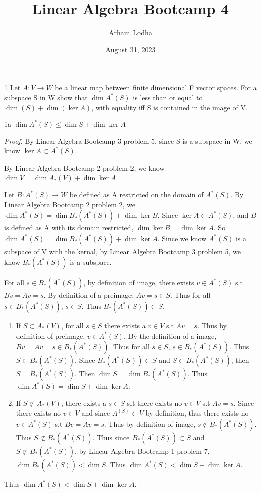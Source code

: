 \documentclass{article}
\newcommand{\rarr}[0]{\rightarrow}
\begin{document}
\title{Linear Algebra Bootcamp 4}
\author{Arham Lodha}%
\date{August 31, 2023}%
\maketitle

\begin{PROB}{1}\label{Problem 1.}
	Let $A: V \rarr W$ be a linear map between finite dimensional F vector spaces. For a subspace S in W show that $\dim A^*(S)$ is less than or equal to $\dim(S) + \dim(\ker A)$, with equality iff S is contained in the image of V.
\end{PROB}
\begin{claim}{1a}
	$\dim A^*(S) \leq \dim S + \dim \ker{A}$
\end{claim}
\begin{proof}
	By Linear Algebra Bootcamp 3 problem 5, since S is a subspace in W, we know $\ker A \subset A^*(S)$.

	By Linear Algebra Bootcamp 2 problem 2, we know $\dim V = \dim A_*(V) + \dim \ker{A}$.

	Let $B: A^*(S) \rarr W$ be defined as A restricted on the domain of $A^*(S)$. By Linear Algebra Bootcamp 2 problem 2, we $\dim A^*(S) = \dim B_*(A^*(S)) + \dim \ker{B}$. Since $\ker A \subset A^*(S)$, and $B$ is defined as A with its domain restricted, $\dim \ker {B} = \dim \ker {A}$. So $\dim A^*(S) = \dim B_*(A^*(S)) + \dim \ker{A}$. Since we know $A^*(S)$ is a subspace of V with the kernal, by Linear Algebra Bootcamp 3 problem 5, we know $B_*(A^*(S))$ is a subspace.


	For all $s \in B_*(A^*(S))$, by definition of image, there exists $v \in A^*(S)$ s.t $Bv = Av = s$. By definition of a preimage, $Av = s \in S$. Thus for all $s \in B_*(A^*(S))$, $s \in S$. Thus $B_*(A^*(S)) \subset S$.

	\begin{enumerate}{}
		\item If $S \subset A_*(V)$, for all $s \in S$ there exists a $v \in V$ s.t $Av = s$. Thus by definition of preimage, $v \in A^*(S)$. By the definition of a image, $Bv = Av = s \in B_*(A^*(S))$. Thus for all $s \in S$, $s \in B_*(A^*(S))$. Thus $S \subset B_*(A^*(S))$. Since $B_*(A^*(S)) \subset S$ and $S \subset B_*(A^*(S))$, then $S =  B_*(A^*(S))$. Then $\dim S = \dim B_*(A^*(S))$. Thus $\dim A^*(S) = \dim S + \dim \ker{A}$.
		\item If $S \not \subset A_*(V)$, there exists a $s \in S$ s.t there exists no $v \in V$ s.t $Av = s$. Since there exists no $v \in V$ and since $A^(S) \subset V$ by definition, thus there exists no $v \in A^*(S)$ s.t $Bv = Av = s$. Thus by definition of image, $s \not \in  B_*(A^*(S))$. Thus $S \not \subset B_*(A^*(S))$. Thus since $B_*(A^*(S)) \subset S$ and $S \not \subset B_*(A^*(S))$, by Linear Algebra Bootcamp 1 problem 7, $\dim B_*(A^*(S)) < \dim S$. Thus $\dim A^*(S) < \dim S + \dim \ker{A}$.
	\end{enumerate}

	Thus $\dim A^*(S) < \dim S + \dim \ker{A}$.
\end{proof}
\end{document}
